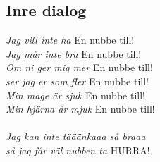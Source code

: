 

\newpage


\subsection*{Inre dialog} 

\textit{Jag vill inte ha} \hfill En nubbe till! \hspace*{15pt} \\
\textit{Jag  mår inte bra} \hfill En nubbe till! \hspace*{15pt} \\
\textit{Om ni ger mig mer} \hfill En nubbe till! \hspace*{15pt} \\
\textit{ser jag er som fler} \hfill En nubbe till! \hspace*{15pt} \\
\textit{Min mage är sjuk} \hfill En nubbe till! \hspace*{15pt} \\
\textit{Min hjärna är mjuk} \hfill En nubbe till! \hspace*{15pt} \\
\\
\textit{Jag kan inte tääänkaaa så braaa}\\
\textit{så jag får väl nubben ta} \hfill HURRA! \hspace*{37pt} 




\newpage
